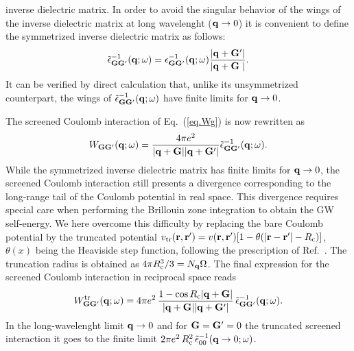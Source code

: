 \documentclass[twocolumn,prb,showpacs,superscriptaddress]{revtex4}
\def\w{\omega}
\def\q{{\bf q}}
\def\G{{\bf G}}
\def\Gp{{\bf G^\prime}}
\def\r{{\bf r}}
\def\rp{{\bf r^\prime}}
\begin{document}
inverse dielectric matrix. 
%
In order to avoid the singular behavior of the wings of the inverse dielectric matrix 
at long wavelenght ($\q\rightarrow 0$) it is convenient to define the symmetrized inverse
dielectric matrix as follows:\cite{balde_tosa}
  \begin{equation}
  \tilde\epsilon^{-1}_{\G\Gp}(\q;\w) = \epsilon^{-1}_{\G\Gp}(\q;\w)  \frac{|\q+\Gp|}{|\q+\G\phantom{^\prime}|}.
  \end{equation}
It can be verified by direct calculation that, unlike its unsymmetrized counterpart,
the wings of $\tilde\epsilon^{-1}_{\G\Gp}(\q;\w)$ have finite limits for $\q\rightarrow 0$.

The screened Coulomb interaction of Eq.\ (\ref{eq.Wg}) is now rewritten as
  \begin{equation}\label{eq.Wg_symm}
  W_{\G\Gp}(\q;\w) = \frac{4\pi e^2}{|\q+\G||\q+\Gp|}  \tilde\epsilon^{-1}_{\G\Gp}(\q;\w).
  \end{equation}
While the symmetrized inverse dielectric matrix has finite limits for $\q\rightarrow 0$,
the screened Coulomb interaction still presents a divergence corresponding to the
long-range tail of the Coulomb potential in real space. This divergence requires special
care when performing the Brillouin zone integration to obtain the GW self-energy.\cite{hl86}
We here overcome this difficulty by replacing the bare Coulomb potential 
by the truncated potential $v_{\rm tr}(\r,\rp)=v(\r,\rp)[1-\theta(|\r-\rp|-R_{\rm c})]$, $\theta(x)$ being the Heaviside step function, following the prescription of 
Ref.~. The truncation radius is obtained as 
$4\pi R_{\rm c}^3/3=N_\q\Omega$. The final expression for the
screened Coulomb interaction in reciprocal space reads
  \begin{equation}\label{eq.Wg_symm}
  W^{\rm tr}_{\G\Gp}(\q;\w) = 4\pi e^2 \, \frac{1-\cos{R_{\rm c}|\q+\G|}}{|\q+\G||\q+\Gp|}\,
     \tilde\epsilon^{-1}_{\G\Gp}(\q;\w).
  \end{equation}
In the long-wavelenght limit $\q\rightarrow 0$ and for $\G=\Gp=0$ the truncated
screened interaction it goes to
the finite limit $2\pi e^2 \, R_{\rm c}^2 \, \tilde\epsilon^{-1}_{00}(\q\rightarrow 0;\w)$.
\end{document}
